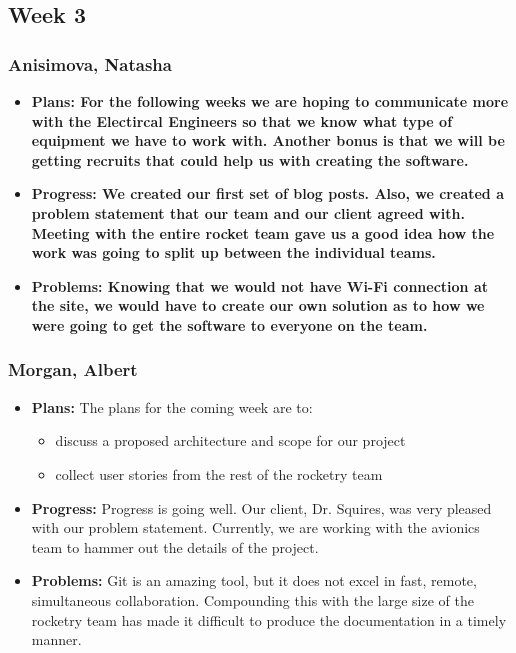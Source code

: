 \documentclass[10pt,draftclsnofoot,onecolumn]{IEEEtran}
\begin{document}
\subsection{Week 3}
\subsubsection{Anisimova, Natasha}
\begin{itemize}
	\item \textbf{Plans: For the following weeks we are hoping to communicate more with the Electircal Engineers so that
		we know what type of equipment we have to work with. Another bonus is that we will be getting recruits that could
		help us with creating the software.}
	\item \textbf{Progress: We created our first set of blog posts. Also, we created a problem statement that our team
		and our client agreed with. Meeting with the entire rocket team gave us a good idea how the work was going to split up
		between the individual teams. }
	\item \textbf{Problems: Knowing that we would not have Wi-Fi connection at the site, we would have to create our own
		solution as to how we were going to get the software to everyone on the team.}
\end{itemize}
\subsubsection{Morgan, Albert}
\begin{itemize}
	\item \textbf{Plans: }
	The plans for the coming week are to:
	\begin{itemize}
		\item discuss a proposed architecture and scope for our project
		\item collect user stories from the rest of the rocketry team
	\end{itemize}
	\item \textbf{Progress: }
	Progress is going well. Our client, Dr. Squires, was very pleased with our problem statement. Currently, we are working with the avionics team to hammer out the details of the project.
	\item \textbf{Problems: }
	Git is an amazing tool, but it does not excel in fast, remote, simultaneous collaboration. Compounding this with the large size of the rocketry team has made it difficult to produce the documentation in a timely manner.
\end{itemize}
\end{document}
